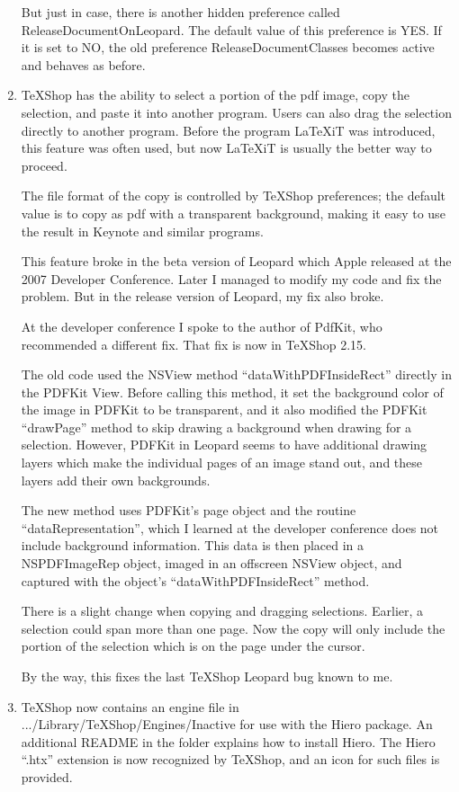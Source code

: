 \documentclass[11pt]{amsart}
\begin{document}
\begin{enumerate}
But just in case, there is another hidden preference called ReleaseDocumentOnLeopard. The default value of this preference is YES. If it is set to NO, the old preference ReleaseDocumentClasses becomes active and behaves as before.

\item TeXShop has the ability to select a portion of the pdf image, copy the selection, and paste it into another program. Users can also drag the selection directly to another program. Before the program LaTeXiT was introduced, this feature was often used, but now LaTeXiT is usually the better way to proceed. 

The file format of the copy is controlled by TeXShop preferences; the default value is to copy as pdf with a transparent background, making it easy to use the result in Keynote and similar programs.

This feature broke in the beta version of Leopard which Apple released at the 2007 Developer Conference. Later I managed to modify my code and fix the problem. But in the release version of Leopard, my fix also broke.

At the developer conference I spoke to the author of PdfKit, who recommended a different fix. That fix is now in TeXShop 2.15.

The old code used the NSView method ``dataWithPDFInsideRect'' directly in the PDFKit View. Before calling this method, it set the background color of the image in PDFKit to be transparent, and it also modified the PDFKit ``drawPage'' method to skip drawing a background when drawing for a selection. However, PDFKit in Leopard seems to have additional drawing layers which make the individual pages of an image stand out, and these layers add their own backgrounds. 

The new method uses PDFKit's page object and the routine ``dataRepresentation'', which I learned at the developer conference does not include background information. This data is then placed in a NSPDFImageRep object, imaged in an offscreen NSView object, and captured with the object's ``dataWithPDFInsideRect'' method. 

There is a slight change when copying and dragging selections. Earlier, a selection could span more than one page. Now the copy will only include the portion of the selection which is on the page under the cursor.

By the way, this fixes the last TeXShop Leopard bug known to me. 

\item TeXShop now contains an engine file in .../Library/TeXShop/Engines/Inactive for use with the Hiero package. An additional README in the folder explains how to install Hiero. The Hiero ``.htx'' extension is now recognized by TeXShop, and an icon for such files is provided.


\end{enumerate}
\end{document}
